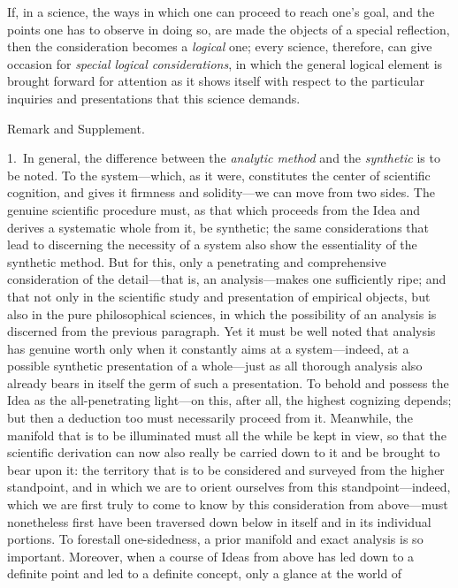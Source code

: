 \documentclass[12pt,a4paper]{book}
\begin{document}
If, in a science, the ways in which one can proceed to reach one's goal, and the points one
has to observe in doing so, are made the objects of a special reflection, then the
consideration becomes a \emph{logical} one; every science, therefore, can give occasion for
\emph{special logical considerations}, in which the general logical element is brought
forward for attention as it shows itself with respect to the particular inquiries and
presentations that this science demands.

\begin{center}Remark and Supplement.\end{center}
1.~In general, the difference between the \emph{analytic method} and the \emph{synthetic}
is to be noted. To the system---which, as it were, constitutes the center of scientific
cognition, and gives it firmness and solidity---we can move from two sides. The genuine
scientific procedure must, as that which proceeds from the Idea and derives a systematic
whole from it, be synthetic; the same considerations that lead to discerning the
necessity of a system also show the essentiality of the synthetic method. But for this, only
a penetrating and comprehensive consideration of the detail---that is, an analysis---makes
one sufficiently ripe; and that not only in the scientific study and presentation of empirical
objects, but also in the pure philosophical sciences, in which the possibility of an analysis
is discerned from the previous paragraph. Yet it must be well noted that analysis has genuine
worth only when it constantly aims at a system---indeed, at a possible synthetic presentation
of a whole---just as all thorough analysis also already bears in itself the germ of such a
presentation. To behold and possess the Idea as the all-penetrating light---on this, after
all, the highest cognizing depends; but then a deduction too must necessarily proceed from it.
Meanwhile, the manifold that is to be illuminated must all the while be kept in view, so that
the scientific derivation can now also really be carried down to it and be brought to bear
upon it: the territory that is to be considered and surveyed from the higher standpoint, and
in which we are to orient ourselves from this standpoint---indeed, which we are first truly to
come to know by this consideration from above---must nonetheless first have been traversed
down below in itself and in its individual portions. To forestall one-sidedness, a prior
manifold and exact analysis is so important. Moreover, when a course of Ideas from above has
led down to a definite point and led to a definite concept, only a glance at the world of
\end{document}
